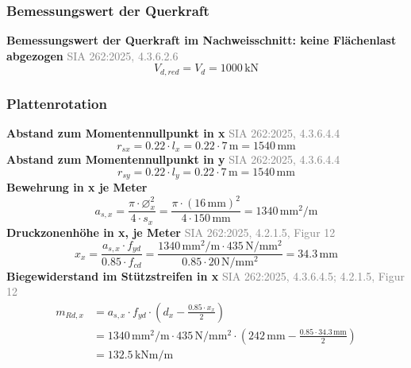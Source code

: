 \documentclass[11pt,a4paper]{article}
\newcommand{\normref}[1]{{\small\textcolor{gray}{#1}}}
\begin{document}
\subsubsection{Bemessungswert der Querkraft}
\noindent\textbf{Bemessungswert der Querkraft im Nachweisschnitt: keine Flächenlast abgezogen} \hfill \normref{SIA 262:2025, 4.3.6.2.6}
\begin{equation*}
V_{d,red} = V_d = 1000\,\mathrm{kN}
\end{equation*}
\subsubsection{Plattenrotation}
\noindent\textbf{Abstand zum Momentennullpunkt in x} \hfill \normref{SIA 262:2025, 4.3.6.4.4}
\begin{equation*}
r_{sx} = 0.22 \cdot l_x = 0.22 \cdot 7\,\mathrm{m} = 1540\,\mathrm{mm}
\end{equation*}
\noindent\textbf{Abstand zum Momentennullpunkt in y} \hfill \normref{SIA 262:2025, 4.3.6.4.4}
\begin{equation*}
r_{sy} = 0.22 \cdot l_y = 0.22 \cdot 7\,\mathrm{m} = 1540\,\mathrm{mm}
\end{equation*}
\noindent\textbf{Bewehrung in x je Meter}
\begin{equation*}
a_{s,x} = \frac{\pi \cdot \varnothing_x^{2}}{4 \cdot s_x} = \frac{\pi \cdot \left(16\,\mathrm{mm}\right)^{2}}{4 \cdot 150\,\mathrm{mm}} = 1340\,\mathrm{mm}^{2}/\mathrm{m}
\end{equation*}
\noindent\textbf{Druckzonenhöhe in x, je Meter} \hfill \normref{SIA 262:2025, 4.2.1.5, Figur 12}
\begin{equation*}
x_x = \frac{a_{s,x} \cdot f_{yd}}{0.85 \cdot f_{cd}} = \frac{1340\,\mathrm{mm}^{2}/\mathrm{m} \cdot 435\,\mathrm{N}/\mathrm{mm}^{2}}{0.85 \cdot 20\,\mathrm{N}/\mathrm{mm}^{2}} = 34.3\,\mathrm{mm}
\end{equation*}
\noindent\textbf{Biegewiderstand im Stützstreifen in x} \hfill \normref{SIA 262:2025, 4.3.6.4.5; 4.2.1.5, Figur 12}
\begin{equation*}
\begin{aligned}
  m_{Rd,x} &= a_{s,x} \cdot f_{yd} \cdot \left(d_x - \frac{0.85 \cdot x_x}{2}\right) \\
  &= 1340\,\mathrm{mm}^{2}/\mathrm{m} \cdot 435\,\mathrm{N}/\mathrm{mm}^{2} \cdot \left(242\,\mathrm{mm} - \frac{0.85 \cdot 34.3\,\mathrm{mm}}{2}\right) \\
  &= 132.5\,\mathrm{kNm}/\mathrm{m}
\end{aligned}
\end{equation*}
\end{document}
